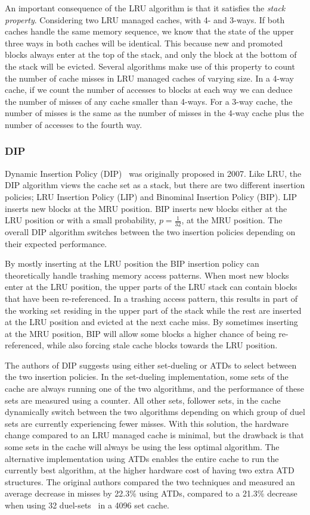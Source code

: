 An important consequence of the LRU algorithm is that it satisfies the \textit{stack property}.
Considering two LRU managed caches, with 4- and 3-ways.
If both caches handle the same memory sequence, we know that the state of the upper three ways in both caches will be identical.
This because new and promoted blocks always enter at the top of the stack, and only the block at the bottom of the stack will be evicted.
Several algorithms make use of this property to count the number of cache misses in LRU managed caches of varying size.
In a 4-way cache, if we count the number of accesses to blocks at each way we can deduce the number of misses of any cache smaller than 4-ways. 
For a 3-way cache, the number of misses is the same as the number of misses in the 4-way cache plus the number of accesses to the fourth way.

\subsubsection{DIP}

Dynamic Insertion Policy (DIP)~\cite{Qureshi2007} was originally proposed in 2007.
Like LRU, the DIP algorithm views the cache set as a stack, but there are two different insertion policies; LRU Insertion Policy (LIP) and Binominal Insertion Policy (BIP).
LIP inserts new blocks at the MRU position.
BIP inserts new blocks either at the LRU position or with a small probability, $p = \frac{1}{32}$, at the MRU position. 
The overall DIP algorithm switches between the two insertion policies depending on their expected performance.

By mostly inserting at the LRU position the BIP insertion policy can theoretically handle trashing memory access patterns.
When most new blocks enter at the LRU position, the upper parts of the LRU stack can contain blocks that have been re-referenced.
In a trashing access pattern, this results in part of the working set residing in the upper part of the stack while the rest are inserted at the LRU position and evicted at the next cache miss.
By sometimes inserting at the MRU position, BIP will allow some blocks a higher chance of being re-referenced, while also forcing stale cache blocks towards the LRU position. 

The authors of DIP suggests using either set-dueling or ATDs to select between the two insertion policies.
In the set-dueling implementation, some sets of the cache are always running one of the two algorithms, and the performance of these sets are measured using a counter.
All other sets, follower sets, in the cache dynamically switch between the two algorithms depending on which group of duel sets are currently experiencing fewer misses.
With this solution, the hardware change compared to an LRU managed cache is minimal, but the drawback is that some sets in the cache will always be using the less optimal algorithm.
The alternative implementation using ATDs enables the entire cache to run the currently best algorithm, at the higher hardware cost of having two extra ATD structures.
The original authors compared the two techniques and measured an average decrease in misses by 22.3\% using ATDs, compared to a 21.3\% decrease when using 32 duel-sets~\cite{Qureshi2007} in a 4096 set cache.


